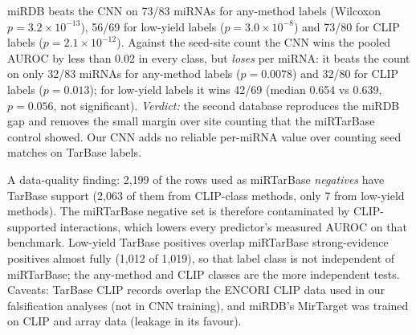 \documentclass[11pt]{article}
\begin{document}
miRDB beats the CNN on 73/83 miRNAs for any-method labels (Wilcoxon $p=3.2\times10^{-13}$), 56/69 for low-yield labels ($p=3.0\times10^{-8}$) and 73/80 for CLIP labels ($p=2.1\times10^{-12}$). Against the seed-site count the CNN wins the pooled AUROC by less than 0.02 in every class, but \emph{loses} per miRNA: it beats the count on only 32/83 miRNAs for any-method labels ($p=0.0078$) and 32/80 for CLIP labels ($p=0.013$); for low-yield labels it wins 42/69 (median 0.654 vs 0.639, $p=0.056$, not significant). \emph{Verdict:} the second database reproduces the miRDB gap and removes the small margin over site counting that the miRTarBase control showed. Our CNN adds no reliable per-miRNA value over counting seed matches on TarBase labels.

A data-quality finding: 2{,}199 of the rows used as miRTarBase \emph{negatives} have TarBase support (2{,}063 of them from CLIP-class methods, only 7 from low-yield methods). The miRTarBase negative set is therefore contaminated by CLIP-supported interactions, which lowers every predictor's measured AUROC on that benchmark. Low-yield TarBase positives overlap miRTarBase strong-evidence positives almost fully (1{,}012 of 1{,}019), so that label class is not independent of miRTarBase; the any-method and CLIP classes are the more independent tests. Caveats: TarBase CLIP records overlap the ENCORI CLIP data used in our falsification analyses (not in CNN training), and miRDB's MirTarget was trained on CLIP and array data (leakage in its favour).
\end{document}

